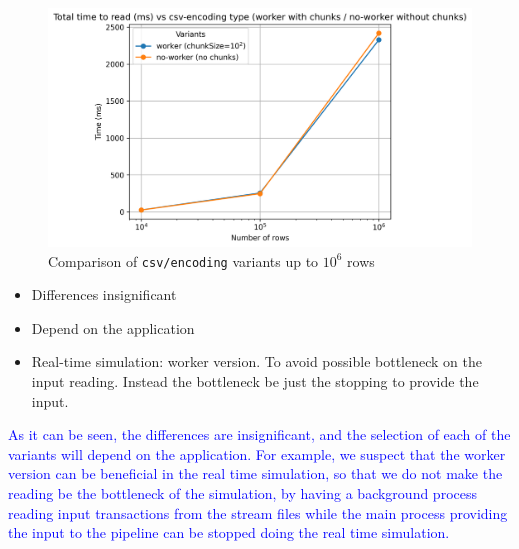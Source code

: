\documentclass{article}
\begin{document}
\begin{figure}[H]
  \centering
  \includegraphics[scale = 0.7]{images/read-input-csv-encoding.png}
  \caption{Comparison of \texttt{csv/encoding} variants up to $10^6$ rows}
\end{figure}

\begin{itemize}
  \item Differences insignificant
  \item Depend on the application
  \item Real-time simulation: worker version. To avoid possible bottleneck on the input reading. Instead the bottleneck be just the stopping to provide the input.
\end{itemize}

\textcolor{blue}{As it can be seen, the differences are insignificant, and the selection of each of the variants will depend on the application. For example, we suspect that the worker version can be beneficial in the real time simulation, so that we do not make the reading be the bottleneck of the simulation, by having a background process reading input transactions from the stream files while the main process providing the input to the pipeline can be stopped doing the real time simulation.}

\cite{angles2008survey}

\end{document}
